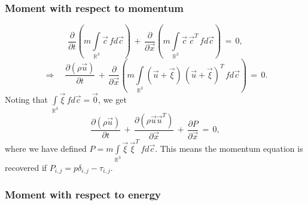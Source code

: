 \subsubsection{Moment with respect to momentum}

\begin{equation}
  \frac{\partial{}}{\partial{t}} \left( m \int \limits_{\mathbb{R}^3} \vec c \, f d\vec c \right) \, + \, \frac{\partial{}}{\partial{\vec x}}  \left( m \int \limits_{\mathbb{R}^3} \vec c\,\vec c^T \, f d\vec c \right)  \, =\, 0,\nonumber
\end{equation}
\begin{equation}
  \Rightarrow \quad \frac{\partial{(\rho \vec u)}}{\partial{t}}  \, + \, \frac{\partial{}}{\partial{\vec x}}  \left( m \int \limits_{\mathbb{R}^3} (\vec u + \vec \xi)\,(\vec u + \vec \xi)^T \, f d\vec c \right)  \, =\, 0.\nonumber
\end{equation}
Noting that $\int \limits_{\mathbb{R}^3} \vec \xi \, f d\vec c = \vec 0$, we get
\begin{equation}
  \frac{\partial{(\rho \vec u)}}{\partial{t}}  \, + \, \frac{\partial{(\rho \vec u \vec u^T)}}{\partial{\vec x}}  \, + \, \frac{\partial{P}}{\partial{\vec x}}    \, =\, 0,\label{mom}
\end{equation}
where we have defined $P = m \int \limits_{\mathbb{R}^3} \vec \xi\,\vec \xi^T \, f d\vec c $. This means the momentum equation is recovered if $P_{i,j} = p \delta_{i,j} - \tau_{i,j}$.

\subsubsection{Moment with respect to energy}

